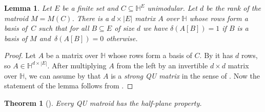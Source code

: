 \documentclass[11pt]{article}
\newtheorem{thm}[theo]{Theorem}
\newtheorem{lem}[theo]{Lemma}
\theoremstyle{definition}
\numberwithin{equation}{section}
\newcommand{\HH}{{\mathbb H}}
\begin{document}
\begin{lem}\label{lem:basisIffDelta1}
    Let $E$ be a finite set and $C\subseteq\HH^E$ unimodular. Let $d$ be the rank of the matroid $M=M(C)$.
    There is a $d\times |E|$ matrix $A$ over $\HH$ whose rows form a basis of~$C$ such that for all $B\subseteq E$ of size $d$ we have $\delta(A[B])=1$ if $B$ is a basis of $M$ and~$\delta(A[B])=0$ otherwise.
\end{lem}

\begin{proof}
 Let $A$ be a matrix over $\HH$ whose rows form a basis of $C$. By \cite[Lemma~3.14]{skewpartial} it has $d$ rows, so $A\in\HH^{d\times |E|}$. After multiplying $A$ from the left by an invertible $d\times d$ matrix over $\HH$, we can assume by \cite[Corollary~3.26]{skewpartial} that $A$ is a \emph{strong QU matrix} in the sense of \cite[Definition~3.23]{skewpartial}. Now the statement of the lemma follows from {\cite[Claim 5.4.1]{skewpartial}}.
\end{proof}


\begin{thm}[{\cite[Conjecture~6.9]{skewpartial}}]
    Every QU matroid has the half-plane property.
\end{thm}
\end{document}
